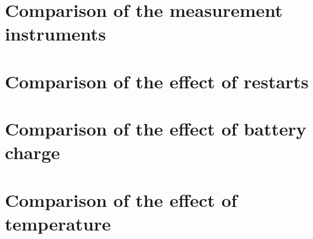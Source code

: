 \section*{Comparison of the measurement instruments}





% 
% 
% 
% 

\section*{Comparison of the effect of restarts}





\section*{Comparison of the effect of battery charge}





\section*{Comparison of the effect of temperature}






% 
% 
% 
% 




